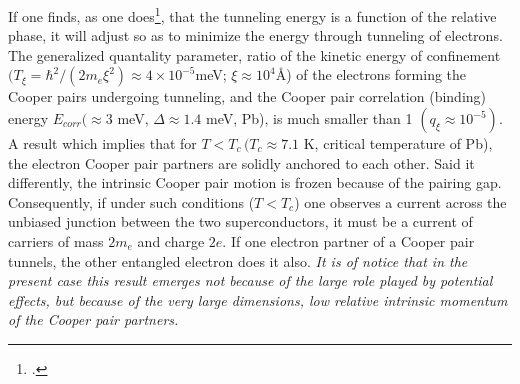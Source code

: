  
 If one finds, as one does\footnote{\cite{Josephson:62,Anderson:63}.}, that the tunneling energy is a function of the relative phase, it will adjust so as to minimize the energy through tunneling of electrons.  The generalized quantality parameter,  ratio of the kinetic energy of confinement $(T_\xi=\hbar^2/(2m_e\xi^2)\approx4\times10^{-5}$meV; $\xi\approx10^4$\AA) of the electrons forming the Cooper pairs undergoing tunneling, and the Cooper pair correlation (binding) energy $E_{corr}(\approx3$ meV, $\Delta\approx1.4$ meV, Pb), is much smaller than 1 $ (q_\xi\approx10^{-5})$. A result which implies that for $T<T_c\,(T_c\approx7.1$ K, critical temperature of Pb), the electron Cooper pair partners are solidly anchored to each other. Said it differently, the intrinsic Cooper pair motion is frozen 
  because of the pairing gap. Consequently, if under such conditions ($T<T_c$) one observes a current across the unbiased junction between the two superconductors, it must be a current of carriers of mass $2m_e$ and charge $2e$. If one electron partner of a Cooper pair tunnels, the other entangled electron does it  also.
 \textit{It is of notice that in the present case this result emerges not because of the large role played by potential effects, but because of the very large dimensions, low relative intrinsic momentum of the Cooper pair partners.}
